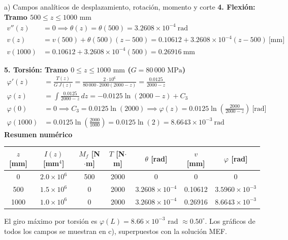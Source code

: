 \begin{desarrollo}{a) Campos analíticos de desplazamiento, rotación, momento y corte}
\textbf{4. Flexión: Tramo $500 \le z \le 1000\text{ mm}$}
\begin{align*}
    v''(z) &= 0 \implies \theta(z) = \theta(500) = 3.2608\times 10^{-4}\ \text{rad} \\
    v(z) &= v(500) + \theta(500)(z - 500) = 0.10612 + 3.2608\times 10^{-4}(z - 500)\ \text{[mm]} \\
    v(1000) &= 0.10612 + 3.2608\times 10^{-4}(500) = 0.26916\ \text{mm}
\end{align*}

\textbf{5. Torsión: Tramo $0 \le z \le 1000\text{ mm}$ ($G = 80\,000\text{ MPa}$)}
\begin{align*}
    \varphi'(z) &= \frac{T(z)}{G\,J(z)} = \frac{2\cdot 10^6}{80\,000 \cdot 2000(2000-z)} = \frac{0.0125}{2000-z} \\[6pt]
    \varphi(z) &= \int \frac{0.0125}{2000-z}\,dz = -0.0125\ln(2000-z) + C_3 \\
    \varphi(0) &= 0 \implies C_3 = 0.0125\ln(2000) \implies \varphi(z) = 0.0125\ln\!\left(\frac{2000}{2000-z}\right)\ \text{[rad]} \\[6pt]
    \varphi(1000) &= 0.0125\ln\!\left(\frac{2000}{1000}\right) = 0.0125\ln(2) = 8.6643\times 10^{-3}\ \text{rad}
\end{align*}
\textbf{Resumen numérico}
\begin{center}
\renewcommand{\arraystretch}{1.2}
\small
\begin{tabular}{ccccccc}
\hline
$z$ [mm] & $I(z)$ [mm$^4$] & $M_f$ [N$\cdot$m] & $T$ [N$\cdot$m] & $\theta$ [rad] & $v$ [mm] & $\varphi$ [rad]\\
\hline
0    & $2.0\times10^6$ & 500 & 2000 & 0 & 0 & 0\\
500  & $1.5\times10^6$ & 0   & 2000 & $3.2608\times10^{-4}$ & 0.10612 & $3.5960\times10^{-3}$\\
1000 & $1.0\times10^6$ & 0   & 2000 & $3.2608\times10^{-4}$ & 0.26916 & $8.6643\times10^{-3}$\\
\hline
\end{tabular}
\end{center}
El giro máximo por torsión es $\varphi(L)=8.66\times10^{-3}$ rad
$\approx 0.50^{\circ}$. Los gráficos de todos los campos se muestran en c),
superpuestos con la solución MEF.

\end{desarrollo}

